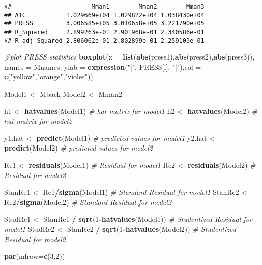 \documentclass[]{article}
\newenvironment{Shaded}{\begin{snugshade}}{\end{snugshade}}
\newcommand{\KeywordTok}[1]{\textcolor[rgb]{0.13,0.29,0.53}{\textbf{#1}}}
\newcommand{\DataTypeTok}[1]{\textcolor[rgb]{0.13,0.29,0.53}{#1}}
\newcommand{\DecValTok}[1]{\textcolor[rgb]{0.00,0.00,0.81}{#1}}
\newcommand{\StringTok}[1]{\textcolor[rgb]{0.31,0.60,0.02}{#1}}
\newcommand{\CommentTok}[1]{\textcolor[rgb]{0.56,0.35,0.01}{\textit{#1}}}
\newcommand{\OperatorTok}[1]{\textcolor[rgb]{0.81,0.36,0.00}{\textbf{#1}}}
\newcommand{\NormalTok}[1]{#1}
\begin{document}
\begin{verbatim}
##                      Mman1        Mman2        Mman3
## AIC           1.029669e+04 1.029822e+04 1.038430e+04
## PRESS         3.006585e+05 3.010658e+05 3.221790e+05
## R_Squared     2.899263e-01 2.901968e-01 2.340586e-01
## R_adj_Squared 2.806062e-01 2.802899e-01 2.259103e-01
\end{verbatim}

\begin{Shaded}
\begin{Highlighting}[]
\CommentTok{#plot PRESS statistics}
\KeywordTok{boxplot}\NormalTok{(}\DataTypeTok{x =} \KeywordTok{list}\NormalTok{(}\KeywordTok{abs}\NormalTok{(press1),}\KeywordTok{abs}\NormalTok{(press2),}\KeywordTok{abs}\NormalTok{(press3)), }\DataTypeTok{names =}\NormalTok{ Mnames,}
        \DataTypeTok{ylab =} \KeywordTok{expression}\NormalTok{(}\StringTok{"|"}\NormalTok{, PRESS[i], }\StringTok{"|"}\NormalTok{),}\DataTypeTok{col =} \KeywordTok{c}\NormalTok{(}\StringTok{"yellow"}\NormalTok{,}\StringTok{"orange"}\NormalTok{,}\StringTok{"violet"}\NormalTok{))}

\NormalTok{Model1 <-}\StringTok{ }\NormalTok{Mback}
\NormalTok{Model2 <-}\StringTok{ }\NormalTok{Mman2}

\NormalTok{h1 <-}\StringTok{ }\KeywordTok{hatvalues}\NormalTok{(Model1) }\CommentTok{# hat matrix for model1 }
\NormalTok{h2 <-}\StringTok{ }\KeywordTok{hatvalues}\NormalTok{(Model2) }\CommentTok{# hat matrix for model2 }

\NormalTok{y1.hat <-}\StringTok{ }\KeywordTok{predict}\NormalTok{(Model1) }\CommentTok{# predicted values for model1 }
\NormalTok{y2.hat <-}\StringTok{ }\KeywordTok{predict}\NormalTok{(Model2) }\CommentTok{# predicted values for model2}

\NormalTok{Re1 <-}\StringTok{ }\KeywordTok{residuals}\NormalTok{(Model1) }\CommentTok{# Residual for model1}
\NormalTok{Re2 <-}\StringTok{ }\KeywordTok{residuals}\NormalTok{(Model2) }\CommentTok{# Residual for model2}

\NormalTok{StanRe1 <-}\StringTok{ }\NormalTok{Re1}\OperatorTok{/}\KeywordTok{sigma}\NormalTok{(Model1) }\CommentTok{# Standard Residual for model1}
\NormalTok{StanRe2 <-}\StringTok{ }\NormalTok{Re2}\OperatorTok{/}\KeywordTok{sigma}\NormalTok{(Model2) }\CommentTok{# Standard Residual for model2}

\NormalTok{StudRe1 <-}\StringTok{ }\NormalTok{StanRe1 }\OperatorTok{/}\StringTok{ }\KeywordTok{sqrt}\NormalTok{(}\DecValTok{1}\OperatorTok{-}\KeywordTok{hatvalues}\NormalTok{(Model1)) }\CommentTok{# Studentized Residual for model1}
\NormalTok{StudRe2 <-}\StringTok{ }\NormalTok{StanRe2 }\OperatorTok{/}\StringTok{ }\KeywordTok{sqrt}\NormalTok{(}\DecValTok{1}\OperatorTok{-}\KeywordTok{hatvalues}\NormalTok{(Model2)) }\CommentTok{# Studentized Residual for model2}


\KeywordTok{par}\NormalTok{(}\DataTypeTok{mfrow=}\KeywordTok{c}\NormalTok{(}\DecValTok{3}\NormalTok{,}\DecValTok{2}\NormalTok{))}
\end{Highlighting}
\end{Shaded}
\end{document}
